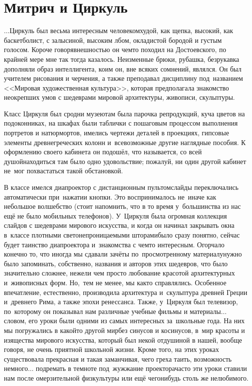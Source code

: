 \newpage
\section*{Митрич и Циркуль}

$\ldots$Циркуль был весьма интересным человеком\mdash худой, как щепка, высокий, как баскетболист, с залысиной, высоким лбом, окладистой бородой и густым голосом. Короче говоря\mdash внешностью он чем\sdash то походил на Достоевского, по крайней мере мне так тогда казалось. Неизменные брюки, рубашка, безрукавка дополняли образ интеллигента, коим он, вне всяких сомнений, являлся. Он был учителем рисования и черчения, а также преподавал дисциплину под~названием <<Мировая художественная культура>>, которая предполагала знакомство неокрепших умов с шедеврами мировой архитектуры, живописи, скульптуры. 

Класс Циркуля был сродни музею\mdash там была парочка репродукций, куча цветов на подоконниках, на шкафах были таблички с пошаговым процессом выполнения портретов и натюрмортов, имелись чертежи деталей в проекциях, гипсовые элементы древнегреческих колонн и~всевозможные другие наглядные пособия. К оформлению своего кабинета он подошёл, что называется, со всей душой\mdash находиться там было одно удовольствие; пожалуй, ни один другой кабинет не~мог похвастаться такой обстановкой. 

В классе имелся диапроектор с дистанционным пультом\mdash слайды переключались автоматически при~нажатии кнопки. Это воспринималось не~иначе как небольшое волшебство (стоит напомнить, что в то время у~большинства из нас ещё не было мобильных телефонов). У~Циркуля была огромная коллекция слайдов с шедеврами мирового искусства, и когда он начинал закрывать окна в~классе плотными светонепроницаемыми шторами\mdash было сразу понятно, сейчас будет таинство диапроектора и~знакомства с чем\sdash то интересным. Огорчало конечно то, что иногда мы сдавали зачёты по~просмотренному материалу\mdash нужно было запоминать, собственно, названия и авторов этих шедевров, что было значительно сложнее, нежели чем просто любование красотой архитектурных и~живописных форм. Но,~тем не менее, мы как\sdash то справлялись. Особенное впечатление, естественно, производила архитектура и~скульптура древней Греции и~древнего Рима, а также эпохи ренессанса. Также, у~Циркуля был телевизор, по~которому он показывал нам различные учебные фильмы и материалы$\ldots$ словом, его уроки были одними из самых интересных за~школьные года. На них мы погружались в какой\sdash то другой мир\mdash без синусов и косинусов, в~мир красоты и изящества мирового искусства, который был некой отдушиной в нашей, вообще говоря, не очень приятной школьной жизни. Кроме того, на этих уроках существовала прекрасная и такая заманчивая, чего греха таить, возможность немного$\ldots$ подремать в темноте под~жужжание проектора\mdash часто эти уроки ставили нам после омерзительной физкультуры или ещё чего\sdash нибудь столь же нелюбимого.

